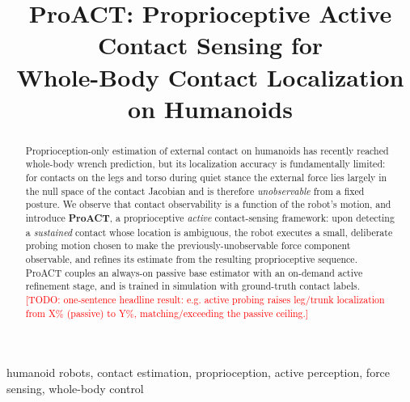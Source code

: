 \documentclass[conference]{IEEEtran}
\newcommand{\todo}[1]{\textcolor{red}{[TODO: #1]}}
\begin{document}
\title{ProACT: Proprioceptive Active Contact Sensing for\\
       Whole-Body Contact Localization on Humanoids}

\author{
}

\maketitle

\begin{abstract}
Proprioception-only estimation of external contact on humanoids has recently
reached whole-body wrench prediction, but its localization accuracy is
fundamentally limited: for contacts on the legs and torso during quiet stance
the external force lies largely in the null space of the contact Jacobian and
is therefore \emph{unobservable} from a fixed posture. We observe that contact
observability is a function of the robot's motion, and introduce \textbf{ProACT},
a proprioceptive \emph{active} contact-sensing framework: upon detecting a
\emph{sustained} contact whose location is ambiguous, the robot executes a small,
deliberate probing motion chosen to make the previously-unobservable force
component observable, and refines its estimate from the resulting proprioceptive
sequence. ProACT couples an always-on passive base estimator with an on-demand
active refinement stage, and is trained in simulation with ground-truth contact
labels.
\todo{one-sentence headline result: e.g. active probing raises leg/trunk
localization from X\% (passive) to Y\%, matching/exceeding the passive ceiling.}
\end{abstract}

\begin{IEEEkeywords}
humanoid robots, contact estimation, proprioception, active perception,
force sensing, whole-body control
\end{IEEEkeywords}

\end{document}

